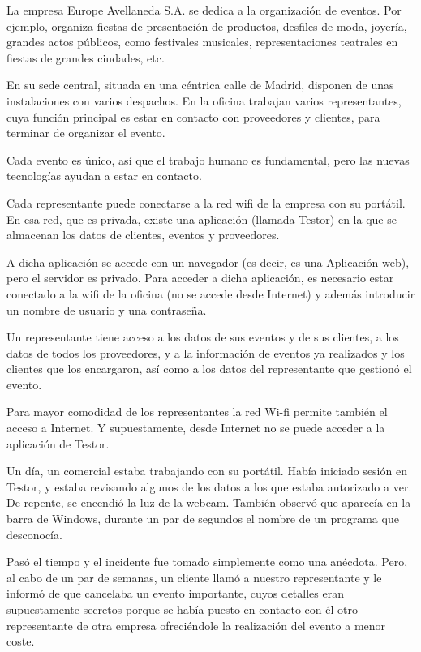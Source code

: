 \documentclass[a4paper]{article}
\begin{document}
La empresa Europe Avellaneda S.A. se dedica a la organización de eventos. Por ejemplo, organiza fiestas de presentación de productos, desfiles de moda, joyería, grandes actos públicos, como festivales musicales, representaciones teatrales en fiestas de grandes ciudades, etc.

En su sede central, situada en una céntrica calle de Madrid, disponen de unas instalaciones con varios despachos. En la oficina trabajan varios representantes, cuya función principal es estar en contacto con proveedores y clientes, para terminar de organizar el evento.

Cada evento es único, así que el trabajo humano es fundamental, pero las nuevas tecnologías ayudan a estar en contacto.

Cada representante puede conectarse a la red wifi de la empresa con su portátil. En esa red, que es privada, existe una aplicación (llamada Testor) en la que se almacenan los datos de clientes, eventos y proveedores.

A dicha aplicación se accede con un navegador (es decir, es una Aplicación web), pero el servidor es privado. Para acceder a dicha aplicación, es necesario estar conectado a la wifi de la oficina (no se accede desde Internet) y además introducir un nombre de usuario y una contraseña.

Un representante tiene acceso a los datos de sus eventos y de sus clientes, a los datos de todos los proveedores, y a la información de eventos ya realizados y los clientes que los encargaron, así como a los datos del representante que gestionó el evento.

Para mayor comodidad de los representantes la red Wi-fi permite también el acceso a Internet. Y supuestamente, desde Internet no se puede acceder a la aplicación de Testor.

Un día, un comercial estaba trabajando con su portátil. Había iniciado sesión en Testor, y estaba revisando algunos de los datos a los que estaba autorizado a ver. De repente, se encendió la luz de la webcam. También observó que aparecía en la barra de Windows, durante un par de segundos el nombre de un programa que desconocía.

Pasó el tiempo y el incidente fue tomado simplemente como una anécdota. Pero, al cabo de un par de semanas, un cliente llamó a nuestro representante y le informó de que cancelaba un evento importante, cuyos detalles eran supuestamente secretos porque se había puesto en contacto con él otro representante de otra empresa ofreciéndole la realización del evento a menor coste.
\end{document}
